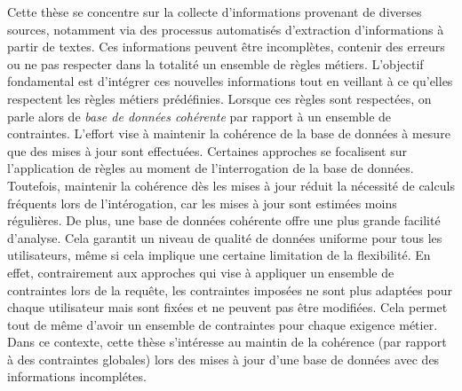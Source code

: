 Cette thèse se concentre sur la collecte d'informations provenant de diverses sources, notamment via des processus automatisés d'extraction d'informations à partir de textes.
Ces informations peuvent être incomplètes, contenir des erreurs ou ne pas respecter dans la totalité un ensemble de règles métiers.
L'objectif fondamental est d'intégrer ces nouvelles informations tout en veillant à ce qu'elles respectent les règles métiers prédéfinies.
Lorsque ces règles sont respectées, on parle alors de \emph{base de données cohérente} par rapport à un ensemble de contraintes.
L'effort vise à maintenir la cohérence de la base de données à mesure que des mises à jour sont effectuées.
Certaines approches se focalisent sur l'application de règles au moment de l'interrogation de la base de données.
Toutefois, maintenir la cohérence dès les mises à jour réduit la nécessité de calculs fréquents lors de l'intérogation, car les mises à jour sont estimées moins régulières.
De plus, une base de données cohérente offre une plus grande facilité d'analyse. %
Cela garantit un niveau de qualité de données uniforme pour tous les utilisateurs, même si cela implique une certaine limitation de la flexibilité.
En effet, contrairement aux approches qui vise à appliquer un ensemble de contraintes lors de la requête, les contraintes imposées ne sont plus adaptées pour chaque utilisateur mais sont fixées et ne peuvent pas être modifiées.
Cela permet tout de même d'avoir un ensemble de contraintes pour chaque exigence métier.
Dans ce contexte, cette thèse s'intéresse au maintin de la cohérence (par rapport à des contraintes globales) lors des mises à jour d'une base de données avec des informations incomplétes.

